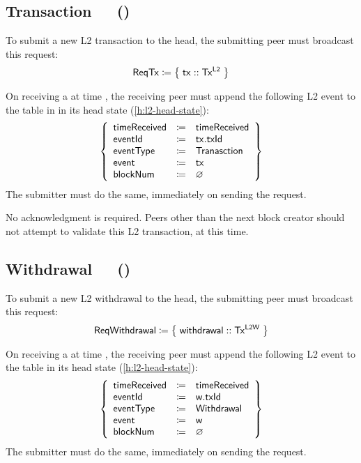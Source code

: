 \documentclass[../hydrozoa.tex]{subfiles}
\begin{document}
\subsection{Transaction~~~()}%
\label{h:l2-consensus-transaction}%

To submit a new L2 transaction to the head, the submitting peer must broadcast this request:
\begin{equation*}
  \mathsf{ReqTx} \coloneq \;\bigr\{\; \mathsf{tx} :: \mathsf{Tx^{L2}} \;\bigr\}
\end{equation*}

On receiving a  at time , the receiving peer must append the following L2 event to the  table in  in its head state (\cref{h:l2-head-state}):
\begin{equation*}
  \left\{
  \begin{array}{lll}
    \mathsf{timeReceived} &\coloneq& \mathsf{timeReceived} \\
    \mathsf{eventId} &\coloneq& \mathsf{tx.txId} \\
    \mathsf{eventType} &\coloneq& \mathsf{Tranasction} \\
    \mathsf{event} &\coloneq& \mathsf{tx} \\
    \mathsf{blockNum} &\coloneq& \varnothing
  \end{array}\right\}
\end{equation*}
The submitter must do the same, immediately on sending the request.

No acknowledgment is required.
Peers other than the next block creator should not attempt to validate this L2 transaction, at this time.

\subsection{Withdrawal~~~()}%
\label{h:l2-consensus-withdrawal}%

To submit a new L2 withdrawal to the head, the submitting peer must broadcast this request:
\begin{equation*}
  \mathsf{ReqWithdrawal} \coloneq \;\bigr\{\; \mathsf{withdrawal} :: \mathsf{Tx^{L2W}} \;\bigr\}
\end{equation*}

On receiving a  at time , the receiving peer must append the following L2 event to the  table in its head state (\cref{h:l2-head-state}):
\begin{equation*}
  \left\{
  \begin{array}{lll}
    \mathsf{timeReceived} &\coloneq& \mathsf{timeReceived} \\
    \mathsf{eventId} &\coloneq& \mathsf{w.txId} \\
    \mathsf{eventType} &\coloneq& \mathsf{Withdrawal} \\
    \mathsf{event} &\coloneq& \mathsf{w} \\
    \mathsf{blockNum} &\coloneq& \varnothing
  \end{array}\right\}
\end{equation*}
The submitter must do the same, immediately on sending the request.
\end{document}
